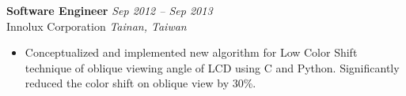 \vspace{0.3em}
\textbf{\sffamily Software Engineer} \hfill \textit{Sep 2012 -- Sep 2013} \\
{\sffamily Innolux Corporation} \hfill \textit{Tainan, Taiwan}
\vspace{0.1em}

\begin{itemize}[leftmargin=*, topsep=2pt, partopsep=2.5pt]
\setlength\itemsep{0.3em}
\item Conceptualized and implemented new algorithm for Low Color Shift technique of oblique viewing angle of LCD using C and Python. Significantly reduced the color shift on oblique view by 30\%.
\end{itemize}
